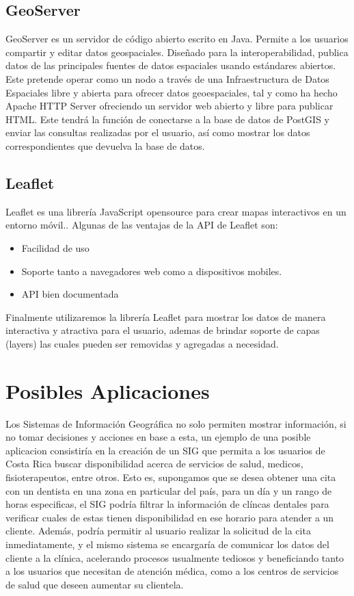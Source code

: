 \documentclass{article}
\begin{document}
\subsection {GeoServer}
GeoServer es un servidor de c\'odigo abierto escrito en Java. Permite a los usuarios compartir y editar datos geospaciales. Dise\~nado para la interoperabilidad, publica datos de las principales fuentes de datos espaciales usando est\'andares abiertos.\cite{geoserver} Este pretende operar como un nodo a trav\'es de una Infraestructura de Datos Espaciales libre y abierta para ofrecer datos geoespaciales, tal y como ha hecho Apache HTTP Server ofreciendo un servidor web abierto y libre para publicar HTML.\newline
Este tendr\'a la funci\'on de conectarse a la base de datos de PostGIS y enviar las consultas realizadas por el usuario, as\'i como mostrar los datos correspondientes que devuelva la base de datos.

\subsection {Leaflet}

Leaflet es una librer\'ia JavaScript opensource para crear mapas interactivos en un entorno m\'ovil.\cite{leaflet}. Algunas de las ventajas de la API de Leaflet son:
\begin{itemize}
\item Facilidad de uso
\item Soporte tanto a navegadores web como a dispositivos mobiles.
\item API bien documentada
\end{itemize}
Finalmente utilizaremos la librer\'ia Leaflet para mostrar los datos de manera interactiva y atractiva para el usuario, ademas de brindar soporte de capas (layers) las cuales pueden ser removidas y agregadas a necesidad.

\section {Posibles Aplicaciones}
Los Sistemas de Informaci\'on Geogr\'afica no solo permiten mostrar informaci\'on, si no tomar decisiones y acciones en base a esta, un ejemplo de una posible aplicacion consistir\'ia en la creaci\'on de un SIG que permita a los usuarios de Costa Rica buscar disponibilidad acerca de servicios de salud, medicos, fisioterapeutos, entre otros. Esto es, supongamos que se desea obtener una cita con un dentista en una zona en particular del pa\'is, para un d\'ia y un rango de horas especificas, el SIG podr\'ia filtrar la informaci\'on de cl\'incas dentales para verificar cuales de estas tienen disponibilidad en ese horario para atender a un cliente. Adem\'as, podr\'ia permitir al usuario realizar la solicitud de la cita inmediatamente, y el mismo sistema se encargar\'ia de comunicar los datos del cliente a la cl\'inica, acelerando procesos usualmente tediosos y beneficiando tanto a los usuarios que necesitan de atenci\'on m\'edica, como a los centros de servicios de salud que deseen aumentar su clientela.
\end{document}
